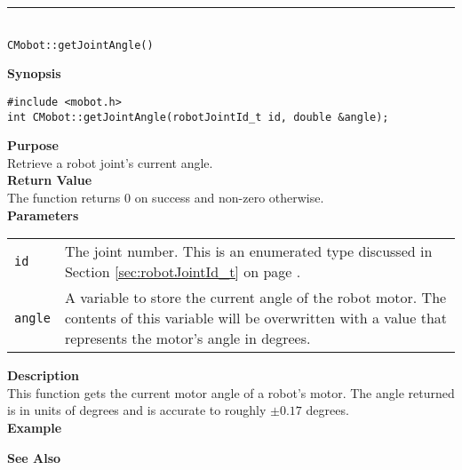\noindent
\vspace{5pt}
\rule{4.5in}{0.015in}\\
\noindent
{\LARGE \texttt{CMobot::getJointAngle()}}\\
{}

\noindent
{\bf Synopsis}
\vspace{-8pt}
\begin{verbatim}
#include <mobot.h>
int CMobot::getJointAngle(robotJointId_t id, double &angle);
\end{verbatim}

\noindent
{\bf Purpose}\\
Retrieve a robot joint's current angle.\\

\noindent
{\bf Return Value}\\
The function returns 0 on success and non-zero otherwise.\\

\noindent
{\bf Parameters}\\
\vspace{-0.1in}
\begin{description}
\item               
\begin{tabular}{p{15 mm}p{145 mm}}
\texttt{id} & The joint number. This is an enumerated type 
discussed in Section \ref{sec:robotJointId_t} on page
\pageref{sec:robotJointId_t}.\\
\texttt{angle} & A variable to store the current angle of the robot
motor. The contents of this variable will be overwritten with a value that
represents the motor's angle in degrees.  \\
\end{tabular}
\end{description}

\noindent
{\bf Description}\\
This function gets the current motor angle of a robot's motor. The
angle returned is in units of degrees and is accurate to roughly $\pm0.17$
degrees. \\

\noindent
{\bf Example}\\
\noindent

\noindent
{\bf See Also}\\

